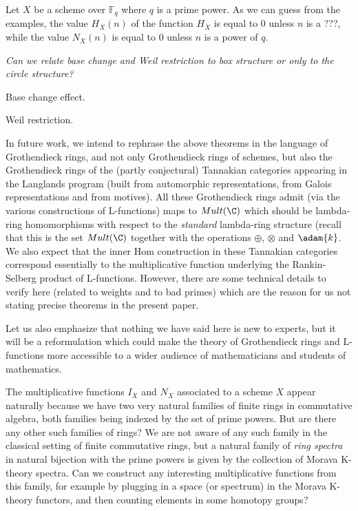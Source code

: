 \begin{remark}
Let $X$ be a scheme over $\mathbb{F}_q$ where $q$ is a prime power. As we can guess from the examples, the value $H_X(n)$ of the function $H_X$ is equal to 0 unless $n$ is a ???, while the value $N_X(n)$ is equal to 0 unless $n$ is a power of $q$.
\end{remark}

\emph{Can we relate base change and Weil restriction to box structure or only to the circle structure?}

\begin{theorem}

Base change effect.
\end{theorem}


\begin{theorem}

Weil restriction.
\end{theorem}



In future work, we intend to rephrase the above theorems in the language of Grothendieck rings, and not only Grothendieck rings of schemes, but also the Grothendieck rings of the (partly conjectural) Tannakian categories appearing in the Langlands program (built from automorphic representations, from Galois representations and from motives). All these Grothendieck rings admit (via the various constructions of L-functions) maps to $Mult(\C)$ which should be lambda-ring homomorphisms with respect to the \emph{standard} lambda-ring structure (recall that this is the set $Mult(\C)$ together with the operations $\oplus$, $\otimes$ and $\adam{k}$. We also expect that the inner Hom construction in these Tannakian categories correspond essentially to the multiplicative function underlying the Rankin-Selberg product of L-functions. However, there are some technical details to verify here (related to weights and to bad primes) which are the reason for us not stating precise theorems in the present paper. 

Let us also emphasize that nothing we have said here is new to experts, but it will be a reformulation which could make the theory of Grothendieck rings and L-functions more accessible to a wider audience of mathematicians and students of mathematics. 



\begin{remark}
The multiplicative functions $I_X$ and $N_X$ associated to a scheme $X$ appear naturally because we have two very natural families of finite rings in commutative algebra, both families being indexed by the set of prime powers. But are there any other such families of rings? We are not aware of any such family in the classical setting of finite commutative rings, but a natural family of \emph{ring spectra} in natural bijection with the prime powers is given by the collection of Morava K-theory spectra. Can we construct any interesting multiplicative functions from this family, for example by plugging in a space (or spectrum) in the Morava K-theory functors, and then counting elements in some homotopy groups? 
\end{remark}

